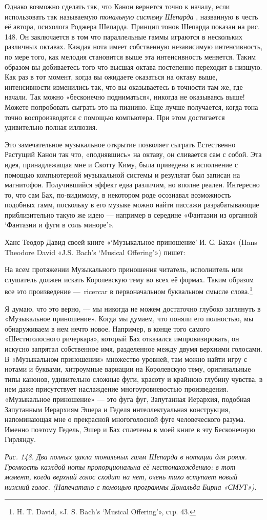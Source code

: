 \documentclass[../main.tex]{subfiles}
\begin{document}
Однако возможно сделать так, что Канон вернется точно к началу, если использовать так называемую \emph{тональную систему Шепарда} , названную в честь её автора, психолога Роджера Шепарда. Принцип тонов Шепарда показан на рис. 148. Он заключается в том что параллельные гаммы играются в нескольких различных октавах. Каждая нота имеет собственную независимую интенсивность, по мере того, как мелодия становится выше эта интенсивность меняется. Таким образом вы добиваетесь того что высшая октава постепенно переходит в низшую. Как раз в тот момент, когда вы ожидаете оказаться на октаву выше, интенсивности изменились так, что вы оказываетесь в точности там же, где начали. Так можно «бесконечно подниматься», никогда не оказываясь выше! Можете попробовать сыграть это на пианино. Еще лучше получается, когда тона точно воспроизводятся с помощью компьютера. При этом достигается удивительно полная иллюзия.

Это замечательное музыкальное открытие позволяет сыграть Естественно Растущий Канон так что, «поднявшись» на октаву, он сливается сам с собой. Эта идея, принадлежащая мне и Скотту Киму, была приведена в исполнение с помощью компьютерной музыкальной системы и результат был записан на магнитофон. Получившийся эффект едва различим, но вполне реален. Интересно то, что сам Бах, по-видимому, в некотором роде осознавал возможность подобных гамм, поскольку в его музыке можно найти пассажи разрабатывающие приблизительно такую же идею --- например в середине «Фантазии из органной \enquote*{Фантазии и фуги в соль миноре}».

Ханс Теодор Давид своей книге «\enquote*{Музыкальное приношение} И. С. Баха» (Hans Theodore David «J.S. Bach's \enquote*{Musical Offering}») пишет:

На всем протяжении Музыкального приношения читатель, исполнитель или слушатель должен искать Королевскую тему во всех её формах. Таким образом все это произведение ---~ricercar в первоначальном буквальном смысле слова.\footnote{H. T. David, «J. S. Bach's \enquote*{Musical Offering}», стр. 43.}

Я думаю, что это верно, --- мы никогда не можем достаточно глубоко заглянуть в «Музыкальное приношение». Когда мы думаем, что поняли его полностью, мы обнаруживаем в нем нечто новое. Например, в конце того самого «Шестиголосного ричеркара», который Бах отказался импровизировать, он искусно запрятал собственное имя, разделенное между двумя верхними голосами. В «Музыкальном приношении» множество уровней, там можно найти игру с нотами и буквами, хитроумные вариации на Королевскую тему, оригинальные типы канонов, удивительно сложные фуги, красоту и крайнюю глубину чувства, в нем даже присутствует наслаждение многоуровневостью произведения. «Музыкальное приношение» --- это фуга фуг, Запутанная Иерархия, подобная Запутанным Иерархиям Эшера и Геделя интеллектуальная конструкция, напоминающая мне о прекрасной многоголосной фуге человеческого разума. Именно поэтому Гедель, Эшер и Бах сплетены в моей книге в эту Бесконечную Гирлянду.

\emph{Рис. 148. Два полных цикла тональных гамм Шепарда в нотации для рояля. Громкость каждой ноты пропорциональна её местонахождению: в тот момент, когда верхний голос сходит на нет, очень тихо вступает новый нижний голос. (Напечатано с помощью программы Дональда Бирна «СМУТ»).}
\end{document}
